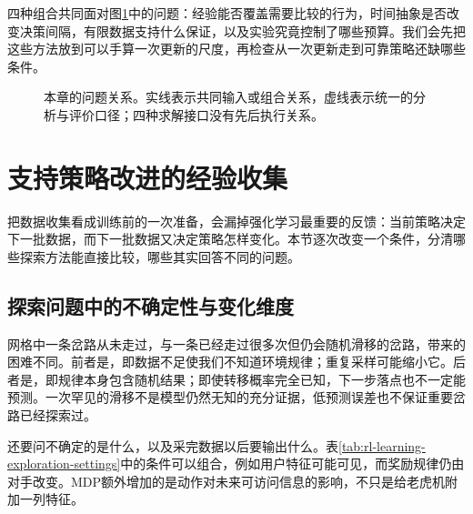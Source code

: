 四种组合共同面对图\ref{fig:rl-learning-map}中的问题：经验能否覆盖需要比较的行为，时间抽象是否改变决策间隔，有限数据支持什么保证，以及实验究竟控制了哪些预算。我们会先把这些方法放到可以手算一次更新的尺度，再检查从一次更新走到可靠策略还缺哪些条件。

\begin{figure}[htbp]
  \centering
  
  \caption{本章的问题关系。实线表示共同输入或组合关系，虚线表示统一的分析与评价口径；四种求解接口没有先后执行关系。}
  \label{fig:rl-learning-map}
\end{figure}

\section{支持策略改进的经验收集}
\label{sec:rl-learning-experience}

把数据收集看成训练前的一次准备，会漏掉强化学习最重要的反馈：当前策略决定下一批数据，而下一批数据又决定策略怎样变化。本节逐次改变一个条件，分清哪些探索方法能直接比较，哪些其实回答不同的问题。

\subsection{探索问题中的不确定性与变化维度}
\label{sec:rl-learning-uncertainty}

网格中一条岔路从未走过，与一条已经走过很多次但仍会随机滑移的岔路，带来的困难不同。前者是，即数据不足使我们不知道环境规律；重复采样可能缩小它。后者是，即规律本身包含随机结果；即使转移概率完全已知，下一步落点也不一定能预测。一次罕见的滑移不是模型仍然无知的充分证据，低预测误差也不保证重要岔路已经探索过。

还要问不确定的是什么，以及采完数据以后要输出什么。表\ref{tab:rl-learning-exploration-settings}中的条件可以组合，例如用户特征可能可见，而奖励规律仍由对手改变。MDP额外增加的是动作对未来可访问信息的影响，不只是给老虎机附加一列特征。

